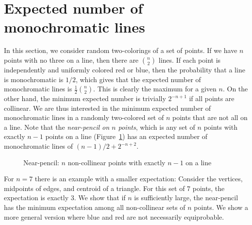 \documentclass[a4paper,11pt,leqno]{article}
\begin{document}
\section{Expected number of monochromatic lines}
In this section, we consider random two-colorings of a set of points.
If we have $n$ points with no three on a line, then there are $\binom{n}{2}$ lines.
If each point is independently and uniformly colored red or blue, then the probability that a line is monochromatic is $1/2$, which gives that the expected number of monochromatic lines is $\frac12\binom{n}{2}$.
This is clearly the maximum for a given $n$.
On the other hand, the minimum expected number is trivially $2^{-n+1}$ if all points are collinear.
We are thus interested in the minimum expected number of monochromatic lines in a randomly two-colored set of $n$ points that are not all on a line.
Note that the \emph{near-pencil on $n$ points}, which is any set of $n$ points with exactly $n-1$ points on a line (Figure~\ref{fig:near-pencil}) has an expected number of monochromatic lines of $(n-1)/2 + 2^{-n+2}$.
\begin{figure}
\centering
{}
\caption{Near-pencil: $n$ non-collinear points with exactly $n-1$ on a line}\label{fig:near-pencil}
\end{figure}
For $n=7$ there is an example with a smaller expectation:
Consider the vertices, midpoints of edges, and centroid of a triangle.
For this set of $7$ points, the expectation is exactly $3$.
We show that if $n$ is sufficiently large, the near-pencil has the minimum expectation among all non-collinear sets of $n$ points.
We show a more general version where blue and red are not necessarily equiprobable.
\end{document}
